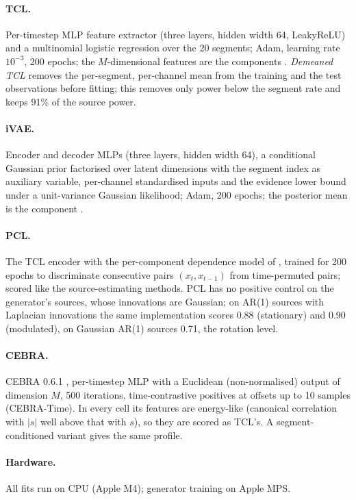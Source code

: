 \paragraph{TCL.} Per-timestep MLP feature extractor (three layers, hidden width 64, LeakyReLU) and a multinomial logistic regression over the 20 segments; Adam, learning rate $10^{-3}$, 200 epochs; the $M$-dimensional features are the components \citep{hyvarinen2016tcl}.
\textit{Demeaned TCL} removes the per-segment, per-channel mean from the training and the test observations before fitting; this removes only power below the segment rate and keeps 91\% of the source power.
\paragraph{iVAE.} Encoder and decoder MLPs (three layers, hidden width 64), a conditional Gaussian prior factorised over latent dimensions with the segment index as auxiliary variable, per-channel standardised inputs and the evidence lower bound under a unit-variance Gaussian likelihood; Adam, 200 epochs; the posterior mean is the component \citep{khemakhem2020ivae}.
\paragraph{PCL.} The TCL encoder with the per-component dependence model of \citet{hyvarinen2017pcl}, trained for 200 epochs to discriminate consecutive pairs $(x_t, x_{t-1})$ from time-permuted pairs; scored like the source-estimating methods.
PCL has no positive control on the generator's sources, whose innovations are Gaussian; on AR(1) sources with Laplacian innovations the same implementation scores 0.88 (stationary) and 0.90 (modulated), on Gaussian AR(1) sources 0.71, the rotation level.
\paragraph{CEBRA.} CEBRA 0.6.1 \citep{schneider2023cebra}, per-timestep MLP with a Euclidean (non-normalised) output of dimension $M$, 500 iterations, time-contrastive positives at offsets up to 10 samples (CEBRA-Time).
In every cell its features are energy-like (canonical correlation with $|s|$ well above that with $s$), so they are scored as TCL's.
A segment-conditioned variant gives the same profile.
\paragraph{Hardware.} All fits run on CPU (Apple M4); generator training on Apple MPS.

